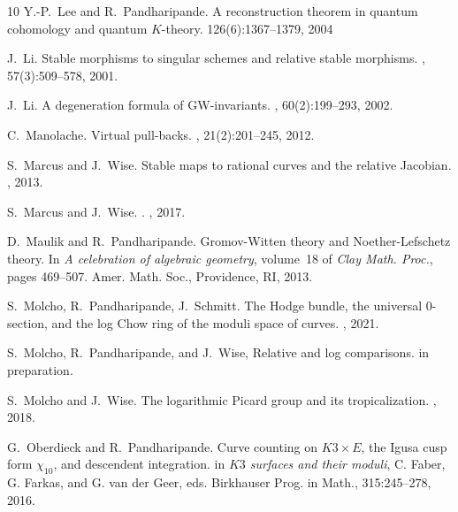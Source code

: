\documentclass[a4paper,12pt]{article} %
\theoremstyle{definition}
\theoremstyle{plain}%
\begin{document}
\begin{thebibliography}{10}
 Y.-P.~Lee and R.~Pandharipande.
\newblock A reconstruction theorem in quantum cohomology
and quantum $K$-theory.
 126(6):1367--1379, 2004 

J.~Li.
\newblock Stable morphisms to singular schemes and relative stable morphisms.
, 57(3):509--578, 2001.

J.~Li.
\newblock A degeneration formula of {GW}-invariants.
, 60(2):199--293, 2002.

C.~Manolache.
\newblock Virtual pull-backs.
, 21(2):201--245, 2012.

S.~Marcus and J.~Wise.
\newblock Stable maps to rational curves and the relative Jacobian.
, 2013.

S.~Marcus and J.~Wise.
.
,
  2017.

D.~Maulik and R.~Pandharipande.
\newblock Gromov-{W}itten theory and {N}oether-{L}efschetz theory.
\newblock In {\em A celebration of algebraic geometry}, volume~18 of {\em Clay
  Math. Proc.}, pages 469--507. Amer. Math. Soc., Providence, RI, 2013.

S.~Molcho, R.~Pandharipande, J.~Schmitt.
\newblock The {H}odge bundle, the universal $0$-section, and the log {C}how ring of the moduli space of curves.
,
  2021.

S.~Molcho, R.~Pandharipande, and J.~Wise, 
\newblock Relative and log comparisons.
\newblock in preparation.



S.~Molcho and J.~Wise.
\newblock The logarithmic Picard group and its tropicalization.
,
  2018.



G.~Oberdieck and R.~Pandharipande.
\newblock Curve counting on $K3\times E$, the Igusa cusp form $\chi_{10}$,
and descendent integration.
\newblock in {\em $K3$ surfaces and their moduli}, C. Faber, G. Farkas,
and G. van der Geer, eds.
\newblock Birkhauser Prog. in Math., 315:245--278, 2016.


\end{thebibliography}
\end{document}
